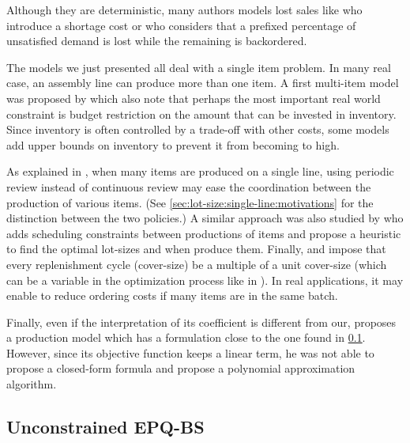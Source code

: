 Although they are deterministic, many authors models lost sales like \citet{Salameh2003} who introduce a shortage cost or \citet{Park1982} who considers that a prefixed percentage of unsatisfied demand is lost while the remaining is backordered.


\medskip


The models we just presented all deal with a single item problem.
In many real case, an assembly line can produce more than one item.
A first multi-item model was proposed by \citet{Hadley1963} which also note that perhaps the most important real world constraint is budget restriction on the amount that can be invested in inventory.
Since inventory is often controlled by a trade-off with other costs, some models add upper bounds on inventory to prevent it from becoming to high.


As explained in \citet{Eynan2007}, when many items are produced on a single line, using periodic review instead of continuous review may ease the coordination between the production of various items.
(See \cref{sec:lot-size:single-line:motivations} for the distinction between the two policies.)
A similar approach was also studied by \citet{Madigan1968} who adds scheduling constraints between productions of items and propose a heuristic to find the optimal lot-sizes and when produce them.
Finally, \citet{Bomberger1966} and \citet{Goyal1974} impose that every replenishment cycle (cover-size) be a multiple of a unit cover-size (which can be a variable in the optimization process like in \citet{Silver1976}).
In real applications, it may enable to reduce ordering costs if many items are in the same batch.


\medskip


Finally, even if the interpretation of its coefficient is different from our, \citet{Ziegler1982} proposes a production model which has a formulation close to the one found in \cref{sec:lot-size:single-line:models:unconstrained}.
However, since its objective function keeps a linear term, he was not able to propose a closed-form formula and propose a polynomial approximation algorithm.



\subsection{Unconstrained EPQ-BS}
\label{sec:lot-size:single-line:models:unconstrained}


